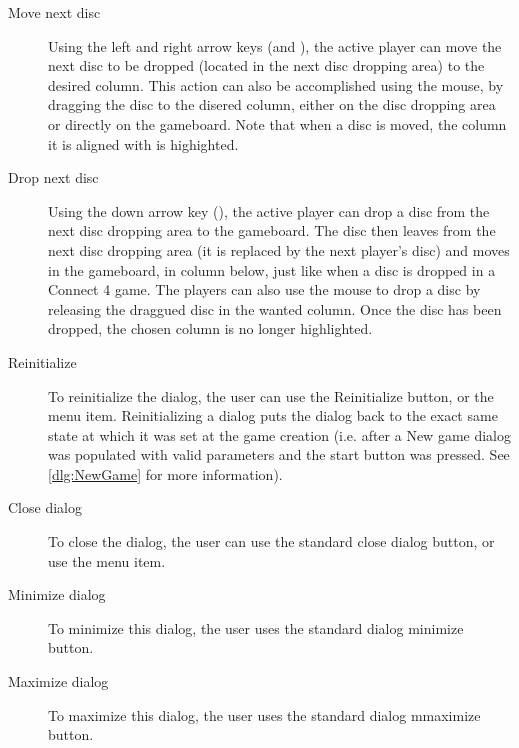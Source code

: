   \begin{description}
    \item[Move next disc]  Using the left and right arrow keys (\LArrow and
                           \RArrow), the active player can move the next disc
                           to be dropped (located in the next disc dropping
                           area) to the desired column. This action can also
                           be accomplished using the mouse, by dragging the disc
                           to the disered column, either on the disc dropping
                           area or directly on the gameboard. Note that when a
                           disc is moved, the column it is aligned with is
                           highighted.

    \item[Drop next disc]  Using the down arrow key (\DArrow), the active player
                           can drop a disc from the next disc dropping area to
                           the gameboard. The disc then leaves from the next
                           disc dropping area (it is replaced by the next player's
                           disc) and moves in the gameboard, in column below,
                           just like when a disc is dropped in a Connect 4 game.
                           The players can also use the mouse to drop a disc by
                           releasing the draggued disc in the wanted column. Once
                           the disc has been dropped, the chosen column is no
                           longer highlighted.

    \item[Reinitialize]    To reinitialize the dialog, the user can use the
                           Reinitialize button, or the 
                           menu item. Reinitializing a dialog puts the dialog
                           back to the exact same state at which it was set
                           at the game creation (i.e. after a New game dialog
                           was populated with valid parameters and the start
                           button was pressed. See \cref{dlg:NewGame} for more
                           information).

    \item[Close dialog]    To close the dialog, the user can use the standard
                           close dialog button, or use the 
                           menu item.

    \item[Minimize dialog] To minimize this dialog, the user uses the standard
                           dialog minimize button.

    \item[Maximize dialog] To maximize this dialog, the user uses the standard
                           dialog mmaximize button.
  \end{description}


